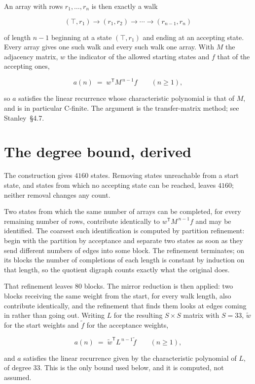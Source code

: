 \documentclass[11pt]{article}
\theoremstyle{definition}
\begin{document}
An array with rows $r_1,\dots,r_n$ is then exactly a walk

\[(\top,r_1) \to (r_1,r_2) \to \cdots \to (r_{n-1},r_n)\]

of length $n-1$ beginning at a state $(\top,r_1)$ and ending at an accepting state. Every array gives one such walk and every such walk one array. With $M$ the adjacency matrix, $w$ the indicator of the allowed starting states and $f$ that of the accepting ones,

\[a(n) \;=\; w^{\mathsf T} M^{\,n-1} f \qquad (n \ge 1),\]

so $a$ satisfies the linear recurrence whose characteristic polynomial is that of $M$, and is in particular C-finite. The argument is the transfer-matrix method; see Stanley~\S4.7.

\section{The degree bound, derived}

The construction gives $4160$ states. Removing states unreachable from a start state, and states from which no accepting state can be reached, leaves $4160$; neither removal changes any count.

Two states from which the same number of arrays can be completed, for every remaining number of rows, contribute identically to $w^{\mathsf T}M^{\,n-1}f$ and may be identified. The coarsest such identification is computed by partition refinement: begin with the partition by acceptance and separate two states as soon as they send different numbers of edges into some block. The refinement terminates; on its blocks the number of completions of each length is constant by induction on that length, so the quotient digraph counts exactly what the original does.

That refinement leaves $80$ blocks. The mirror reduction is then applied: two blocks receiving the same weight from the start, for every walk length, also contribute identically, and the refinement that finds them looks at edges coming in rather than going out. Writing $L$ for the resulting $S \times S$ matrix with $S = 33$, $\tilde w$ for the start weights and $\tilde f$ for the acceptance weights,

\[a(n) \;=\; \tilde w^{\mathsf T} L^{\,n-1} \tilde f \qquad (n \ge 1),\]

and $a$ satisfies the linear recurrence given by the characteristic polynomial of $L$, of degree $33$. This is the only bound used below, and it is computed, not assumed.
\end{document}
